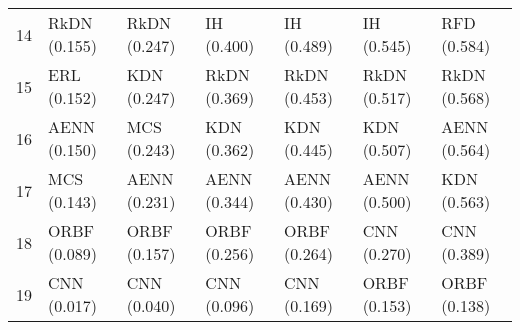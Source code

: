 \begin{tabular}{lllllll}
14   &      RkDN (0.155) &      RkDN (0.247) &        IH (0.400) &        IH (0.489) &        IH (0.545) &       RFD (0.584) \\
15   &       ERL (0.152) &       KDN (0.247) &      RkDN (0.369) &      RkDN (0.453) &      RkDN (0.517) &      RkDN (0.568) \\
16   &      AENN (0.150) &       MCS (0.243) &       KDN (0.362) &       KDN (0.445) &       KDN (0.507) &      AENN (0.564) \\
17   &       MCS (0.143) &      AENN (0.231) &      AENN (0.344) &      AENN (0.430) &      AENN (0.500) &       KDN (0.563) \\
18   &      ORBF (0.089) &      ORBF (0.157) &      ORBF (0.256) &      ORBF (0.264) &       CNN (0.270) &       CNN (0.389) \\
19   &       CNN (0.017) &       CNN (0.040) &       CNN (0.096) &       CNN (0.169) &      ORBF (0.153) &      ORBF (0.138) \\
\bottomrule
\end{tabular}
